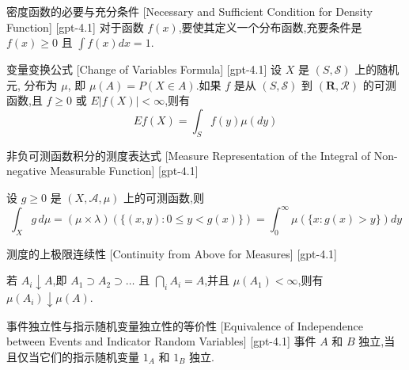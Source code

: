 \documentclass[UTF8]{ctexart}
\begin{document}
    
    
    \begin{dfn}
        {密度函数的必要与充分条件}
        [Necessary and Sufficient Condition for Density Function]
        [gpt-4.1]
        对于函数 $f(x)$,要使其定义一个分布函数,充要条件是 $f(x) \geq 0$ 且 $\int f(x) dx = 1$.
    \end{dfn}
    
    
    
    \begin{thm}
        {变量变换公式}
        [Change of Variables Formula]
        [gpt-4.1]
        设 $X$ 是 $(S, \mathcal{S})$ 上的随机元, 分布为 $\mu$, 即 $\mu(A) = P(X \in A)$.如果 $f$ 是从 $(S, \mathcal{S})$ 到 $(\mathbf{R}, \mathcal{R})$ 的可测函数,且 $f \geq 0$ 或 $E|f(X)| < \infty$,则有
\[
E f ( X ) = \int_{S} f ( y ) \mu ( d y )
\]

    \end{thm}
    
    
    
    \begin{thm}
        {非负可测函数积分的测度表达式}
        [Measure Representation of the Integral of Non-negative Measurable Function]
        [gpt-4.1]
        
设 $g \ge 0$ 是 $(X, \mathcal{A}, \mu)$ 上的可测函数,则
\[
\int_{X} g \, d\mu = (\mu \times \lambda) (\{ (x, y): 0 \leq y < g(x) \}) = \int_{0}^{\infty} \mu(\{ x : g(x) > y \}) dy
\]

    \end{thm}
    
    
    
    \begin{thm}
        {测度的上极限连续性}
        [Continuity from Above for Measures]
        [gpt-4.1]
        
若 $A_{i} \downarrow A$,即 $A_{1} \supset A_{2} \supset \ldots$ 且 $\bigcap_{i} A_{i} = A$,并且 $\mu(A_{1}) < \infty$,则有 $\mu(A_{i}) \downarrow \mu(A)$.

    \end{thm}
    
    
    
    \begin{thm}
        {事件独立性与指示随机变量独立性的等价性}
        [Equivalence of Independence between Events and Indicator Random Variables]
        [gpt-4.1]
        事件 $A$ 和 $B$ 独立,当且仅当它们的指示随机变量 $1_A$ 和 $1_B$ 独立.
    \end{thm}
    
\end{document}
